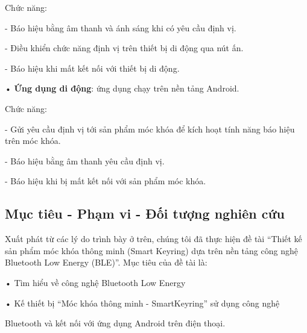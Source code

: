 Chức năng:

- Báo hiệu bằng âm thanh và ánh sáng khi có yêu cầu định vị.

- Điều khiển chức năng định vị trên thiết bị di động qua nút ấn.
	
- Báo hiệu khi mất kết nối với thiết bị di động.
		

• \textbf{Ứng dụng di động}: ứng dụng chạy trên nền tảng Android. 

Chức năng:

- Gửi yêu cầu định vị tới sản phẩm móc khóa để kích hoạt tính năng báo hiệu trên móc khóa.

- Báo hiệu bằng âm thanh yêu cầu định vị.

- Báo hiệu khi bị mất kết nối với sản phẩm móc khóa.

\subsection{Mục tiêu - Phạm vi - Đối tượng nghiên cứu}

Xuất phát từ các lý do trình bày ở trên, chúng tôi đã thực hiện đề tài “Thiết kế sản phẩm móc khóa thông minh (Smart Keyring) dựa trên nền tảng công nghệ Bluetooth Low Energy (BLE)”. Mục tiêu của đề tài là:

• Tìm hiểu về công nghệ Bluetooth Low Energy

• Kế thiết bị “Móc khóa thông minh - SmartKeyring” sử dụng công nghệ

Bluetooth và kết nối với ứng dụng Android trên điện thoại.

\nomenclature[g-p]{$\pi$}{ $\simeq 3.14\ldots$}                                             %

